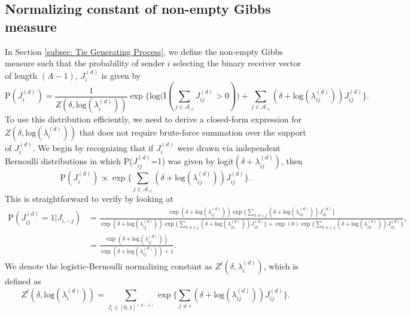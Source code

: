 \documentclass[a4paper]{article}
\begin{document}
   	 \subsection{Normalizing constant of non-empty Gibbs measure}\label{subsec: non-empty Gibbs measure}
  	 In Section \ref{subsec: Tie Generating Process}, we define the non-empty Gibbs measure such that 
 the probability of sender $i$ selecting the binary receiver vector of length $(A-1)$, $J_i^{(d)}$ is given by
  	 \begin{equation*} \text{P}(J_i^{(d)}) = \frac{1}{Z(\delta,\mbox{log}(\lambda_i^{(d)}))} \exp\Big\{ \mbox{log}\big(\text{I}( \sum_{j \in \mathcal{A}_{\backslash i}} J^{(d)}_{ij} > 0 )\big) + \sum_{j \in \mathcal{A}_{\backslash i}} (\delta+\mbox{log}(\lambda_{ij}^{(d)}))J_{ij}^{(d)} \Big\}.
  	 \end{equation*}
  	 	 To use this distribution efficiently, we need to derive a closed-form expression for $Z(\delta,\mbox{log}(\lambda_{i}^{(d)}))$ that does not require brute-force summation over the support of $J_i^{(d)}$. We begin by recognizing that if $J_i^{(d)}$ were drawn via independent Bernoulli distributions in which P($J_{ij}^{(d)}$=1) was given by logit$\left(\delta+\lambda_{ij}^{(d)}\right)$, then \begin{equation*}\text{P}(J_i^{(d)}) \propto \exp\Big\{  \sum_{j \in \mathcal{A}_{\backslash i}} (\delta+\mbox{log}(\lambda_{ij}^{(d)}))J_{ij}^{(d)}\Big\}.  	 \end{equation*}
  	 	  This is straightforward to verify by looking at 
  	 	  \begin{equation*}
  	 	  \begin{aligned}\text{P}(J_{ij}^{(d)}=1|J_{i,-j})&=\frac{ \exp{(\delta+\mbox{log}(\lambda_{ij}^{(d)}))}\exp\Big\{ \sum_{h\neq i,j} (\delta+\mbox{log}(\lambda_{ih}^{(d)}))J_{ih}^{(d)} \Big\}}{\exp{(\delta+\mbox{log}(\lambda_{ij}^{(d)}))}\exp\Big\{   \sum_{h\neq i,j} (\delta+\mbox{log}(\lambda_{ih}^{(d)}))J_{ih}^{(d)} \Big\}+ \exp{(0)}\exp\Big\{ \sum_{h\neq i,j} (\delta+\mbox{log}(\lambda_{ih}^{(d)}))J_{ih}^{(d)} \Big\}},\\
  	 	  &=\frac{ \exp{(\delta+\mbox{log}(\lambda_{ij}^{(d)}))}}{\exp{(\delta+\mbox{log}(\lambda_{ij}^{(d)}))} + 1}.\end{aligned}\end{equation*}
  	 	  We denote the logistic-Bernoulli normalizing constant as $Z^{l}(\delta,\lambda_i^{(d)})$, which is defined as 
  	 	  \begin{equation*}
  	 	  Z^{l}(\delta,\mbox{log}(\lambda_{i}^{(d)}))=\sum_{J_i \in [0,1]^{(A-1)}} \exp\Big\{\sum_{j\neq i} (\delta+\mbox{log}(\lambda_{ij}^{(d)}))J_{ij}^{(d)} \Big\}.
  	 	  \end{equation*}
  	 
\end{document}
